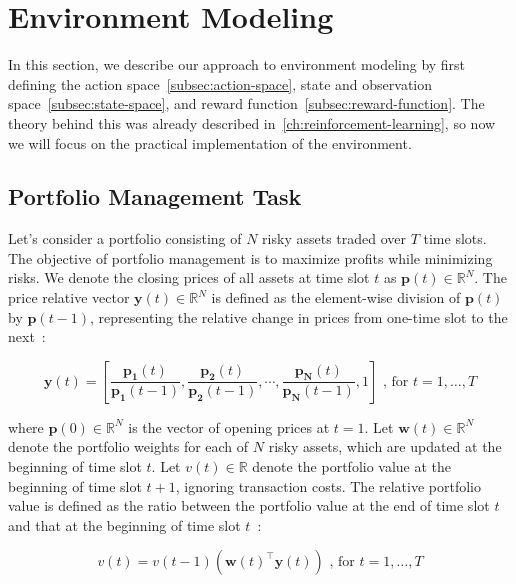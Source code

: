 \documentclass[../xlapes02]{subfiles}
\begin{document}
    \section{Environment Modeling}\label{sec:environment-modeling}
    In this section, we describe our approach to environment modeling by first defining the action space~\cref{subsec:action-space}, state and observation space~\cref{subsec:state-space}, and reward function~\cref{subsec:reward-function}. The theory behind this was already described in~\cref{ch:reinforcement-learning}, so now we will focus on the practical implementation of the environment.

    \subsection{Portfolio Management Task}\label{subsec:portfolio-management-task}
    Let's consider a portfolio consisting of $N$ risky assets traded over $T$ time slots. The objective of portfolio management is to maximize profits while minimizing risks. We denote the closing prices of all assets at time slot $t$ as $\mathbf{p}(t) \in \mathbb{R}^N$. The price relative vector $\mathbf{y}(t) \in \mathbb{R}^N$ is defined as the element-wise division of $\mathbf{p}(t)$ by $\mathbf{p}(t-1)$, representing the relative change in prices from one-time slot to the next~\cite{finrl-portfolio-allocation-2020}:

    \begin{equation}
        \mathbf{y}(t)=\left[\frac{\mathbf{p_1}(t)}{\mathbf{p_1}(t-1)}, \frac{\mathbf{p_2}(t)}{\mathbf{p_2}(t-1)}, \cdots, \frac{\mathbf{p_N}(t)}{\mathbf{p_N}(t-1)}, 1\right]\text{ , for }t=1,\ldots,T\label{eq:equation4}
    \end{equation}

    where $\mathbf{p}(0) \in \mathbb{R}^N$ is the vector of opening prices at $t = 1$. Let $\mathbf{w}(t) \in \mathbb{R}^N$ denote the portfolio weights for each of $N$ risky assets, which are updated at the beginning of time slot $t$. Let $v(t) \in \mathbb{R}$ denote the portfolio value at the beginning of time slot $t+1$, ignoring transaction costs. The relative portfolio value is defined as the ratio between the portfolio value at the end of time slot $t$ and that at the beginning of time slot $t$~\cite{finrl-portfolio-allocation-2020}:

    \begin{equation}
        v(t)=v(t-1)(\mathbf{w}(t)^\top\mathbf{y}(t))\text{ , for }t=1,\ldots,T\label{eq:equation4}
    \end{equation}
\end{document}
